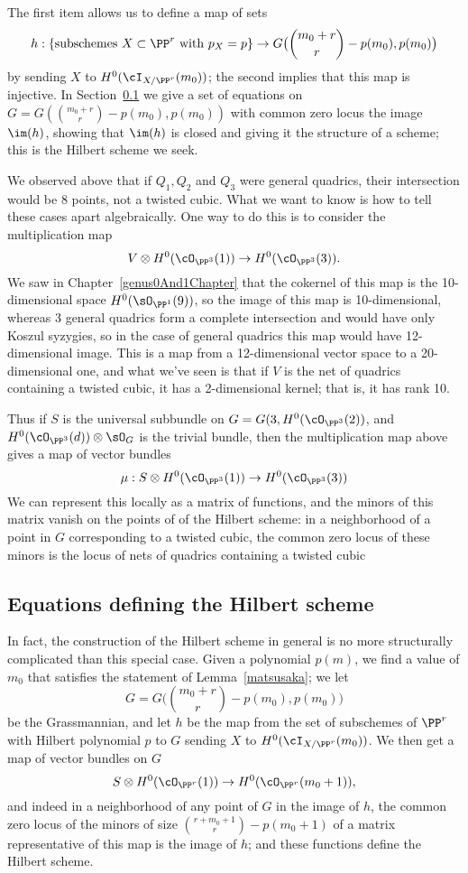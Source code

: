 The first item allows us to define a  map of sets
$$
h : \left\{ \text{subschemes $X \subset \PP^r$ with $p_X=p$} \right\}  \to G\big(\binom{m_0+r}{r} - p(m_0), p(m_0)\big)
$$
by sending $X$ to $H^0(\cI_{X/\PP^r}(m_0))$; the second implies that this map is injective.  In Section~\ref{eqns of Hilb} we give a set of equations on $G = G(\binom{m_0+r}{r} - p(m_0), p(m_0))$ with common zero locus the image $\im(h)$, showing that $\im(h)$ is closed and giving it the structure of a scheme; this is the Hilbert scheme we seek.


We observed above that if $Q_1, Q_2$ and $Q_3$ were general quadrics, their intersection would be
8 points,  not a twisted cubic. What we want to know is how to tell these cases apart algebraically. One way to do this is to consider the multiplication map
$$
V \otimes H^0(\cO_{\PP^3}(1)) \to H^0(\cO_{\PP^3}(3)).
$$
We saw in Chapter~\ref{genus0And1Chapter} that the cokernel of this map is the 10-dimensional space $H^0(\sO_{\PP^1}(9))$, so the image of this map is 10-dimensional, whereas
3 general quadrics form a complete intersection and would have only Koszul syzygies, so
in the case of general quadrics this map would have 12-dimensional image.
This is a map from a 12-dimensional vector space to a 20-dimensional one, and what we've seen is that if $V$ is the net of quadrics containing a twisted cubic, it has a 2-dimensional kernel; that is, it has rank 10. 

Thus if $S$ is the universal subbundle on $G = G(3, H^0(\cO_{\PP^3}(2))$, and  $H^0(\cO_{\PP^3}(d))\otimes \sO_G$ is the trivial bundle, then the multiplication map above gives a map of vector bundles
$$
\mu: S \otimes H^0(\cO_{\PP^3}(1)) \to H^0(\cO_{\PP^3}(3))
$$
We can represent this locally as a matrix of functions, and the minors of this matrix vanish on the points of
of the Hilbert scheme: in a neighborhood of a point in $G$ corresponding to a twisted cubic, the common zero locus of these minors is the locus of nets of quadrics containing a twisted cubic

\subsection{Equations defining the Hilbert scheme}\label{eqns of Hilb}

In fact, the construction of the Hilbert scheme in general is no more structurally complicated than this special case. Given a polynomial $p(m)$, we find a value of $m_0$ that satisfies the statement of Lemma~\ref{matsusaka}; we let
$$
G = G\big(\binom{m_0+r}{r} - p(m_0), p(m_0)\big)
$$
be the Grassmannian, and let $h$ be the map from the set of subschemes of $\PP^r$ with Hilbert polynomial $p$ to $G$ sending $X$ to $H^0(\cI_{X/\PP^r}(m_0))$. We then get a map of vector bundles  on $G$
$$
S \otimes H^0(\cO_{\PP^r}(1)) \to H^0(\cO_{\PP^r}(m_0+1)),
$$
and indeed in a neighborhood of any point of $G$ in the image of $h$, the common zero locus of the minors of size $\binom{r+m_0+1}{r} - p(m_0+1)$ of a matrix representative of this map is the image of $h$; and these functions define the Hilbert scheme.

